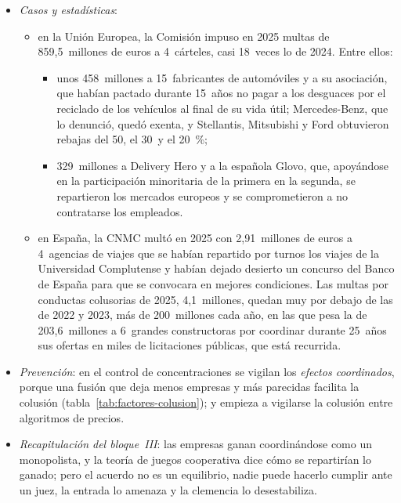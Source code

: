 \documentclass[11pt]{article}
\begin{document}
\begin{itemize}
\begin{itemize}
  \item \emph{Datos}: de los 116~cárteles sancionados por la Comisión Nacional de los Mercados y la Competencia (CNMC) hasta 2022, en 53 (un 46~\%) alguna empresa había pedido clemencia\nocite{CNMC2023Clemencia}; desde 2018, sin embargo, la mayoría se detectan de oficio, con análisis de datos de licitaciones\nocite{CNMC2026Memoria2025}.
  \end{itemize}
\item \emph{Casos y estadísticas}:
  \begin{itemize}
  \item en la Unión Europea, la Comisión impuso en 2025 multas de 859,5~millones de euros a 4~cárteles, casi 18~veces lo de 2024\nocite{CE2026CartelStatistics}. Entre ellos:
    \begin{itemize}
    \item unos 458~millones a 15~fabricantes de automóviles y a su asociación, que habían pactado durante 15~años no pagar a los desguaces por el reciclado de los vehículos al final de su vida útil; Mercedes-Benz, que lo denunció, quedó exenta, y Stellantis, Mitsubishi y Ford obtuvieron rebajas del 50, el 30~y el 20~\%\nocite{CE2025VehiculosFuera};
    \item 329~millones a Delivery Hero y a la española Glovo, que, apoyándose en la participación minoritaria de la primera en la segunda, se repartieron los mercados europeos y se comprometieron a no contratarse los empleados\nocite{CE2025Glovo}.
    \end{itemize}
  \item en España, la CNMC multó en 2025 con 2,91~millones de euros a 4~agencias de viajes que se habían repartido por turnos los viajes de la Universidad Complutense y habían dejado desierto un concurso del Banco de España para que se convocara en mejores condiciones\nocite{CNMC2025AgenciasViajes}. Las multas por conductas colusorias de 2025, 4,1~millones, quedan muy por debajo de las de 2022 y 2023, más de 200~millones cada año\nocite{CNMC2026Memoria2025}, en las que pesa la de 203,6~millones a 6~grandes constructoras por coordinar durante 25~años sus ofertas en miles de licitaciones públicas, que está recurrida\nocite{CNMC2022Constructoras}.
  \end{itemize}
\item \emph{Prevención}: en el control de concentraciones se vigilan los \emph{efectos coordinados}, porque una fusión que deja menos empresas y más parecidas facilita la colusión (tabla~\ref{tab:factores-colusion})\nocite{UE2004Reglamento139}; y empieza a vigilarse la colusión entre algoritmos de precios\nocite{CalvanoEtAl2020Artificial}.
\item \emph{Recapitulación del bloque~III}: las empresas ganan coordinándose como un monopolista, y la teoría de juegos cooperativa dice cómo se repartirían lo ganado; pero el acuerdo no es un equilibrio, nadie puede hacerlo cumplir ante un juez, la entrada lo amenaza y la clemencia lo desestabiliza.
\end{itemize}
\end{document}
